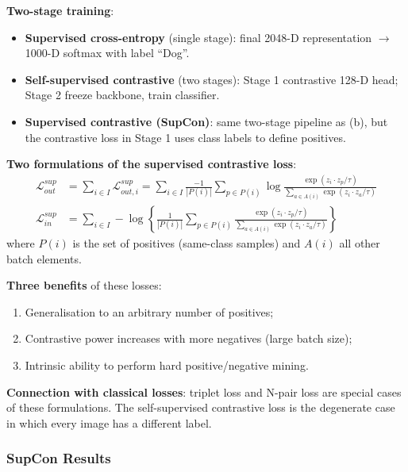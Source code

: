 \documentclass[11pt,a4paper]{article}
\theoremstyle{definition}
\theoremstyle{plain}
\theoremstyle{remark}
\begin{document}
\textbf{Two-stage training}:
\begin{itemize}
    \item[(a)] \textbf{Supervised cross-entropy} (single stage): final 2048-D representation $\to$ 1000-D softmax with label ``Dog''.
    \item[(b)] \textbf{Self-supervised contrastive} (two stages): Stage 1 contrastive 128-D head; Stage 2 freeze backbone, train classifier.
    \item[(c)] \textbf{Supervised contrastive (SupCon)}: same two-stage pipeline as (b), but the contrastive loss in Stage 1 uses class labels to define positives.
\end{itemize}

\textbf{Two formulations of the supervised contrastive loss}:
\begin{align}
    \mathcal{L}^{sup}_{out} &= \sum_{i\in I} \mathcal{L}^{sup}_{out,i}
    = \sum_{i\in I} \frac{-1}{|P(i)|} \sum_{p\in P(i)} \log \frac{\exp(z_i \cdot z_p/\tau)}{\sum_{a\in A(i)} \exp(z_i \cdot z_a/\tau)} \\
    \mathcal{L}^{sup}_{in} &= \sum_{i\in I} -\log \left\{ \frac{1}{|P(i)|} \sum_{p\in P(i)} \frac{\exp(z_i \cdot z_p/\tau)}{\sum_{a\in A(i)} \exp(z_i \cdot z_a/\tau)} \right\}
\end{align}
where $P(i)$ is the set of positives (same-class samples) and $A(i)$ all other batch elements.

\textbf{Three benefits} of these losses:
\begin{enumerate}
    \item Generalisation to an arbitrary number of positives;
    \item Contrastive power increases with more negatives (large batch size);
    \item Intrinsic ability to perform hard positive/negative mining.
\end{enumerate}

\textbf{Connection with classical losses}: triplet loss and N-pair loss are special cases of these formulations. The self-supervised contrastive loss is the degenerate case in which every image has a different label.

\subsubsection{SupCon Results}
\end{document}
